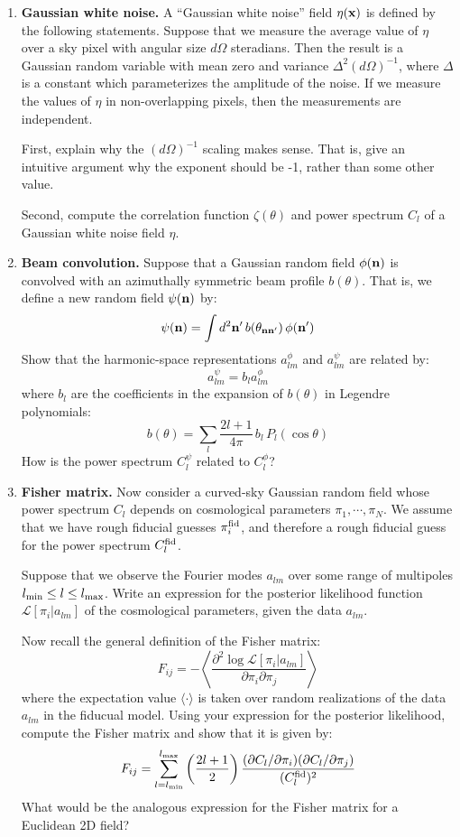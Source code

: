 \documentclass[aps,prd,superscriptaddress,groupedaddress,nofootinbib,nobibnotes]{revtex4}
\newcommand{\be}{\begin{equation}}
\newcommand{\ee}{\end{equation}}
\def\x{{\bf x}}
\def\L{{\mathcal L}}
\def\n{{\bf n}}
\begin{document}
\begin{enumerate}
\item {\bf Gaussian white noise.}
 A ``Gaussian white noise'' field $\eta(\x)$ is defined by the following statements.  Suppose that we
 measure the average value of $\eta$ over a sky pixel with angular size $d\Omega$ steradians.
 Then the result is a Gaussian random variable with mean zero and variance $\Delta^2 (d\Omega)^{-1}$,
 where $\Delta$ is a constant which parameterizes the amplitude of the noise.
 If we measure the values of $\eta$ in non-overlapping pixels, then the measurements are independent.

 First, explain why the $(d\Omega)^{-1}$ scaling makes sense.  That is, give an intuitive argument
 why the exponent should be -1, rather than some other value.

 Second, compute the correlation function $\zeta(\theta)$ and power spectrum $C_l$ of a Gaussian
 white noise field $\eta$.

\item {\bf Beam convolution.}
 Suppose that a Gaussian random field $\phi(\n)$ is convolved with an azimuthally symmetric beam profile $b(\theta)$.
 That is, we define a new random field $\psi(\n)$ by:
\be
 \psi(\n) = \int d^2\n' \, b(\theta_{\n\n'}) \, \phi(\n')
\ee
 Show that the harmonic-space representations $a_{lm}^\phi$ and $a_{lm}^\psi$ are related by:
\be
 a_{lm}^\psi = b_l a_{lm}^\phi
\ee
 where $b_l$ are the coefficients in the expansion of $b(\theta)$ in Legendre polynomials:
\be
 b(\theta) = \sum_l \frac{2l+1}{4\pi} \, b_l \, P_l(\cos\theta)
\ee
 How is the power spectrum $C_l^\psi$ related to $C_l^\phi$?

\item {\bf Fisher matrix.}
 Now consider a curved-sky Gaussian random field whose power spectrum $C_l$ depends on cosmological
 parameters $\pi_1, \cdots, \pi_N$.  We assume that we have rough fiducial guesses $\pi_i^{\rm fid}$,
 and therefore a rough fiducial guess for the power spectrum $C_l^{\rm fid}$.

 Suppose that we observe the Fourier modes $a_{lm}$ over some range of multipoles $l_{\rm min} \le l \le l_{\rm max}$.
 Write an expression for the posterior likelihood function $\L[\pi_i|a_{lm}]$ of the cosmological parameters,
 given the data $a_{lm}$.

 Now recall the general definition of the Fisher matrix:
\be
 F_{ij} = -\left\langle \frac{\partial^2\log\L[\pi_i|a_{lm}]}{\partial\pi_i \partial\pi_j} \right\rangle
\ee
 where the expectation value $\langle \cdot \rangle$ is taken over random realizations of the data $a_{lm}$
 in the fiducual model.  Using your expression for the posterior likelihood, compute the Fisher matrix and
 show that it is given by:
\be
 F_{ij} = \sum_{l=l_{\rm min}}^{l_{\rm max}} \left( \frac{2l+1}{2} \right) \frac{(\partial C_l / \partial\pi_i)(\partial C_l/\partial\pi_j)}{(C_l^{\rm fid})^2}  \label{eq:F_C}
\ee
 What would be the analogous expression for the Fisher matrix for a Euclidean 2D field?


\end{enumerate}
\end{document}
